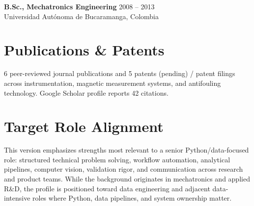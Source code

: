 \documentclass[11pt,a4paper]{article}
\begin{document}
\vspace{4pt}
\textbf{B.Sc., Mechatronics Engineering} \hfill 2008 -- 2013\\
Universidad Autónoma de Bucaramanga, Colombia

\section*{Publications \& Patents}
6 peer-reviewed journal publications and 5 patents (pending) / patent filings across instrumentation, magnetic measurement systems, and antifouling technology. Google Scholar profile reports 42 citations.

\section*{Target Role Alignment}
This version emphasizes strengths most relevant to a senior Python/data-focused role: structured technical problem solving, workflow automation, analytical pipelines, computer vision, validation rigor, and communication across research and product teams. While the background originates in mechatronics and applied R\&D, the profile is positioned toward data engineering and adjacent data-intensive roles where Python, data pipelines, and system ownership matter.
\end{document}
